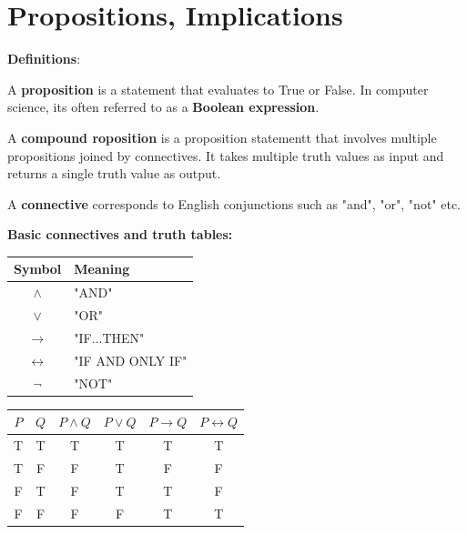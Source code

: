 \documentclass{article}
\begin{document}
\vspace{0.5cm}
\rhead{\leftmark}
\cfoot{}

\text{}


\section{Propositions, Implications}

\textbf{Definitions}:

A \textbf{proposition} is a statement that evaluates to True or False. In computer science, its often referred to as a \textbf{Boolean expression}.

A \textbf{compound roposition} is a proposition statementt that involves multiple propositions joined by connectives. It takes multiple truth values as input and returns a single truth value as output.

A \textbf{connective} corresponds to English conjunctions such as "and", "or", "not" etc.

\noindent

\vspace{0.5cm}

\textbf{\large Basic connectives and truth tables:}

\begin{center}
\begin{tabular}{c|l}
Symbol & Meaning\\
\hline
$\land$ & "AND"\\

$\lor$ & "OR"\\

$\rightarrow$ & "IF...THEN"\\

$\leftrightarrow$ & "IF AND ONLY IF"\\

$\neg$ & "NOT"\\

\end{tabular}
\vline
\begin{tabular}{c|c|c|c|c|c}
$P$ & $Q$ & $P \land Q$ & $P \lor Q$ & $P \rightarrow Q$ & $P \leftrightarrow Q$\\
\hline
T & T & T & T & T & T\\
T & F & F & T & F & F\\
F & T & F & T & T & F\\
F & F & F & F & T & T\\
\end{tabular}
\end{center}
\end{document}
